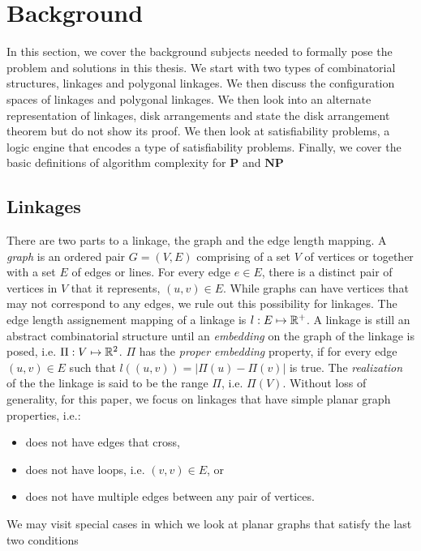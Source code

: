 \section{Background}
In this section, we cover the background subjects needed to formally pose the problem and solutions 
in this thesis.  We start with two types of combinatorial structures, linkages and polygonal 
linkages.  We then discuss the configuration spaces of linkages and polygonal linkages.   We then 
look into an alternate representation of linkages, disk arrangements and state the disk arrangement 
theorem but do not show its proof.  We then look at satisfiability problems, a logic engine that 
encodes a type of satisfiability problems.  Finally, we cover the basic definitions of algorithm 
complexity for $\textbf{P}$ and $\textbf{NP}$
\subsection{Linkages}
There are two parts to a linkage, the graph and the edge length mapping.   A \textit{graph} is an 
ordered pair $G = (V,E)$ comprising of a set $V$ of vertices or together with a set $E$ of edges or 
lines.  For every edge $e \in E$, there is a distinct pair of vertices in $V$ that it represents, 
$(u,v) \in E$.  While graphs can have vertices that may not correspond to any edges, we rule out 
this possibility for linkages.  The edge length assignement mapping of a linkage is $l: E \mapsto 
{\mathbb{R}}^+$. A linkage is still an abstract combinatorial structure until an \textit{embedding} on the 
graph of the linkage is posed, i.e. $\Pi : V \mapsto {\mathbb{R}}^{2}$. $\Pi$ has the \textit{proper 
embedding} property, if for every edge $(u,v) \in E$ such that $l\left( \left(u,v\right) \right) 
= \left\vert \Pi(u) - \Pi(v) \right\vert$ is true. The \textit{realization} of the the linkage is 
said to be the range $\Pi$, i.e. $\Pi(V)$.  Without loss of generality, for this paper, we focus on 
linkages that have simple planar graph properties, i.e.:
\begin{itemize}
\item[\rn{1}] does not have edges that cross,
\item[\rn{2}] does not have loops, i.e. $(v,v) \in E$, or
\item[\rn{3}] does not have multiple edges between any pair of vertices.
\end{itemize}  
We may visit special cases in which we look at planar graphs that satisfy the last two conditions 
